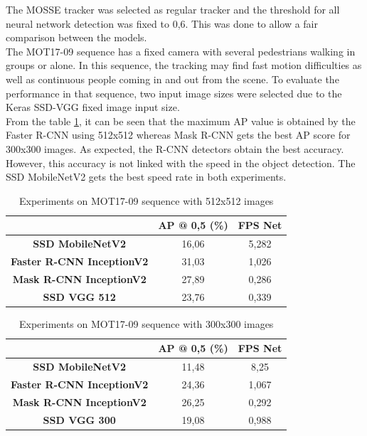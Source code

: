 The MOSSE tracker was selected as regular tracker and the threshold for all neural network detection was fixed to 0,6. This was done to allow a fair comparison between the models.\\
The MOT17-09 sequence has a fixed camera with several pedestrians walking in groups or alone. In this sequence, the tracking may find fast motion difficulties as well as continuous people coming in and out from the scene. To evaluate the performance in that sequence, two input image sizes were selected due to the Keras SSD-VGG fixed image input size.\\ From the table \ref{tab:net_exp_1}, it can be seen that the maximum AP value is obtained by the Faster R-CNN using 512x512 whereas Mask R-CNN gets the best AP score for 300x300 images. As expected, the R-CNN detectors obtain the best accuracy. However, this accuracy is not linked with the speed in the object detection. The SSD MobileNetV2 gets the best speed rate in both experiments.\\
\begin{table}[H]
\scriptsize
\begin{center}
\begin{tabular}{|c|c|c|}
\hline
\textbf{}                         & \textbf{AP @ 0,5 (\%)} & \textbf{FPS Net} \\ \hline
\textbf{SSD MobileNetV2}          & 16,06                  & 5,282            \\ \hline
\textbf{Faster R-CNN InceptionV2} & 31,03                  & 1,026            \\ \hline
\textbf{Mask R-CNN InceptionV2}   & 27,89                  & 0,286            \\ \hline
\textbf{SSD VGG 512}              & 23,76                  & 0,339            \\ \hline
\end{tabular}
\end{center}
\caption{Experiments on MOT17-09 sequence with 512x512 images}
\label{tab:net_exp_1}
\end{table}
\begin{table}[H]
\scriptsize
\begin{center}
\begin{tabular}{|c|c|c|}
\hline
\textbf{}                         & \textbf{AP @ 0,5 (\%)} & \textbf{FPS Net} \\ \hline
\textbf{SSD MobileNetV2}          & 11,48                  & 8,25             \\ \hline
\textbf{Faster R-CNN InceptionV2} & 24,36                  & 1,067            \\ \hline
\textbf{Mask R-CNN InceptionV2}   & 26,25                  & 0,292            \\ \hline
\textbf{SSD VGG 300}              & 19,08                  & 0,988            \\ \hline
\end{tabular}
\end{center}
\caption{Experiments on MOT17-09 sequence with 300x300 images}
\label{tab:net_exp_2}
\end{table}
